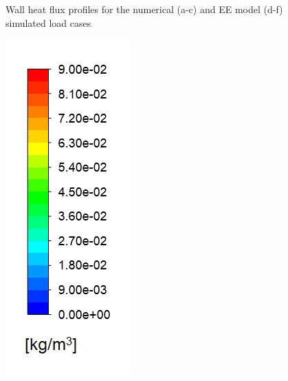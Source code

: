 \documentclass{webofc}
\begin{document}
\begin{figure}[h!]
\setlength{\belowcaptionskip}{0pt} 
\caption{Wall heat flux profiles for the numerical (a-c) and EE model (d-f) simulated load cases}
\label{fig_wall_heat}
\end{figure}

\begin{figure}[h!]
\centering
\includegraphics[scale = 0.25]{concentration}

\end{figure}
\end{document}
